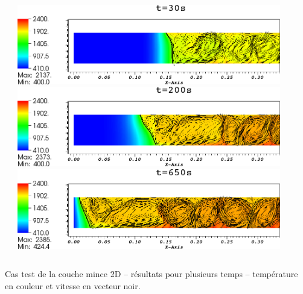 \documentclass{beamer}
\begin{document}
\begin{frame}
\begin{columns}[c]
\begin{column}{0.5 \textwidth}
\begin{center}
\end{center}
\end{column}
    \begin{column}{0.5 \textwidth}
\includegraphics[width=0.9\textwidth]{Figures/CoucheMince0300000.png}\\
\includegraphics[width=0.9\textwidth]{Figures/CoucheMince2000000.png}\\
\includegraphics[width=0.9\textwidth]{Figures/CoucheMince6500000.png}

   \end{column}
   \end{columns}
\center Cas test de la couche mince 2D -- résultats pour plusieurs temps -- température en couleur et vitesse en vecteur noir.

\end{frame}
\end{document}
